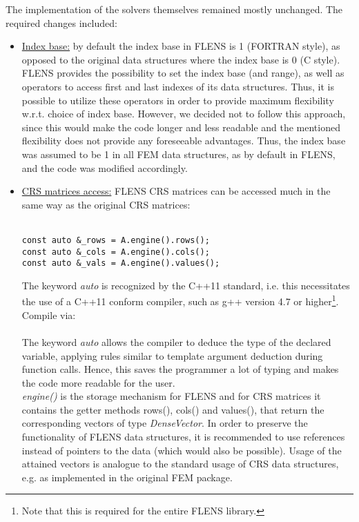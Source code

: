 The implementation of the solvers themselves remained mostly unchanged. The required changes included:
\begin{itemize}
\item \underline{Index base:} by default the index base in FLENS is 1 (FORTRAN style), as opposed to the original data structures where the index base is 0 (C style). FLENS provides the possibility to set the index base (and range), as well as operators to access first and last indexes of its data structures. Thus, it is possible to utilize these operators in order to provide maximum flexibility w.r.t. choice of index base. However, we decided not to follow this approach, since this would make the code longer and less readable and the mentioned flexibility does not provide any foreseeable advantages. Thus, the index base was assumed to be 1 in all FEM data structures, as by default in FLENS, and the code was modified accordingly. 

\item \underline{CRS matrices access:} FLENS CRS matrices can be accessed much in the same way as the original CRS matrices:\\\\
\begin{lstlisting}
const auto &_rows = A.engine().rows();
const auto &_cols = A.engine().cols();
const auto &_vals = A.engine().values();
\end{lstlisting}
The keyword \emph{auto} is recognized by the C++11 standard, i.e. this necessitates the use of a C++11 conform compiler, such as g++ version 4.7 or higher\footnote{Note that this is required for the entire FLENS library.}. Compile via:
\\\\
The keyword \emph{auto} allows the compiler to deduce the type of the declared variable, applying rules similar to template argument deduction during function calls. Hence, this saves the programmer a lot of typing and makes the code more readable for the user.\\
\emph{engine()} is the storage mechanism for FLENS and for CRS matrices it contains the getter methods rows(), cols() and values(), that return the corresponding vectors of type \emph{DenseVector}. In order to preserve the functionality of FLENS data structures, it is recommended to use references instead of pointers to the data (which would also be possible). Usage of the attained vectors is analogue to the standard usage of CRS data structures, e.g. as implemented in the original FEM package.


\end{itemize}
